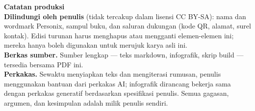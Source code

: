 \clearpage
\thispagestyle{empty}
\begin{flushleft}\small\sffamily
\textbf{Catatan produksi}\\[1.2em]

\textbf{Dilindungi oleh penulis} (tidak tercakup dalam lisensi CC BY-SA): nama
dan wordmark Personix, sampul buku, dan saluran dukungan (kode QR, alamat,
surel kontak). Edisi turunan harus menghapus atau mengganti elemen-elemen ini;
mereka hanya boleh digunakan untuk merujuk karya asli ini.\\[1.2em]

\textbf{Berkas sumber.} Sumber lengkap --- teks markdown, infografik, skrip
build --- tersedia bersama PDF ini.\\[1.2em]

\textbf{Perkakas.} Sewaktu menyiapkan teks dan mengiterasi rumusan, penulis
menggunakan bantuan dari perkakas AI; infografik dirancang bekerja sama dengan
perkakas generatif berdasarkan spesifikasi penulis. Semua gagasan, argumen, dan
kesimpulan adalah milik penulis sendiri.
\end{flushleft}
\clearpage
